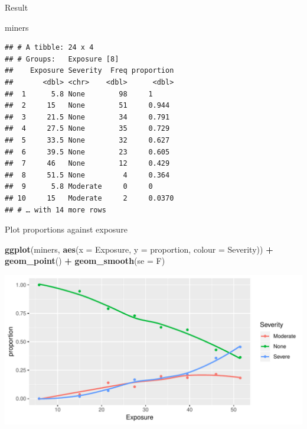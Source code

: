 \documentclass[ignorenonframetext,]{beamer}
\newenvironment{Shaded}{\begin{snugshade}}{\end{snugshade}}
\newcommand{\DataTypeTok}[1]{\textcolor[rgb]{0.13,0.29,0.53}{#1}}
\newcommand{\KeywordTok}[1]{\textcolor[rgb]{0.13,0.29,0.53}{\textbf{#1}}}
\newcommand{\NormalTok}[1]{#1}
\newcommand{\OperatorTok}[1]{\textcolor[rgb]{0.81,0.36,0.00}{\textbf{#1}}}
\newcommand{\StringTok}[1]{\textcolor[rgb]{0.31,0.60,0.02}{#1}}
\begin{document}
\begin{frame}[fragile]{Result}
\protect\hypertarget{result}{}

\small

\begin{Shaded}
\begin{Highlighting}[]
\NormalTok{miners}
\end{Highlighting}
\end{Shaded}

\begin{verbatim}
## # A tibble: 24 x 4
## # Groups:   Exposure [8]
##    Exposure Severity  Freq proportion
##       <dbl> <chr>    <dbl>      <dbl>
##  1      5.8 None        98     1     
##  2     15   None        51     0.944 
##  3     21.5 None        34     0.791 
##  4     27.5 None        35     0.729 
##  5     33.5 None        32     0.627 
##  6     39.5 None        23     0.605 
##  7     46   None        12     0.429 
##  8     51.5 None         4     0.364 
##  9      5.8 Moderate     0     0     
## 10     15   Moderate     2     0.0370
## # … with 14 more rows
\end{verbatim}

\normalsize

\end{frame}

\begin{frame}[fragile]{Plot proportions against exposure}
\protect\hypertarget{plot-proportions-against-exposure}{}

\small

\begin{Shaded}
\begin{Highlighting}[]
\KeywordTok{ggplot}\NormalTok{(miners, }\KeywordTok{aes}\NormalTok{(}\DataTypeTok{x =}\NormalTok{ Exposure, }\DataTypeTok{y =}\NormalTok{ proportion,}
                   \DataTypeTok{colour =}\NormalTok{ Severity)) }\OperatorTok{+}\StringTok{ }
\StringTok{  }\KeywordTok{geom_point}\NormalTok{() }\OperatorTok{+}\StringTok{ }\KeywordTok{geom_smooth}\NormalTok{(}\DataTypeTok{se =}\NormalTok{ F)}
\end{Highlighting}
\end{Shaded}

\includegraphics{figure/unnamed-chunk-85-1.pdf} \normalsize

\end{frame}
\end{document}
